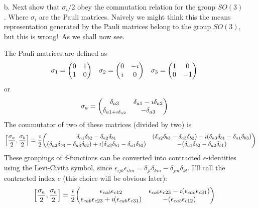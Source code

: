 \documentclass[a4paper,twoside]{article}
\begin{document}
\begin{itemize}
    \item[b.] Next show that $ \sigma_i/2 $ obey the commutation relation for the group $ SO(3) $. Where $ \sigma_i $ are the Pauli matrices. Naively we might think this the means representation generated by the Pauli matrices belong to the group $ SO(3) $, but this is wrong!\ As we shall now see.
        \begin{problem}
            The Pauli matrices are defined as
            \begin{equation}
                \sigma_1 = \mqty(0&1\\1&0) \quad \sigma_2 = \mqty(0&- \imath\\ \imath &0) \quad \sigma_3 = \mqty(1&0\\0&-1)
            \end{equation}
            or
            \begin{equation}
                \sigma_a = \mqty(\delta_{a3} & \delta_{a1} - \imath \delta_{a2} \\ \delta_{a1 + \imath \delta_{a2}} & - \delta_{a3})
            \end{equation}
            The commutator of two of these matrices (divided by two) is
            \begin{equation}
                \comm{\frac{\sigma_a}{2}}{\frac{\sigma_b}{2}} = \frac{\imath}{2} \mqty(\delta_{a1} \delta_{b2} - \delta_{a2} \delta_{b1} & (\delta_{a2} \delta_{b3} - \delta_{a3} \delta_{b2}) - \imath (\delta_{a3} \delta_{b1} - \delta_{a1} \delta_{b3}) \\ (\delta_{a2} \delta_{b3} - \delta_{a3} \delta_{b2})+ \imath (\delta_{a3} \delta_{b1} - \delta_{a1} \delta_{b3}) & -(\delta_{a1} \delta_{b2} - \delta_{a2} \delta_{b1}))
            \end{equation}
            These groupings of $\delta$-functions can be converted into contracted $\epsilon$-identities using the Levi-Civita symbol, since $ \epsilon_{ijk} \epsilon_{ilm} = \delta_{jl} \delta_{km} - \delta_{jm} \delta_{kl} $. I'll call the contracted index $ c $ (this choice will be obvious later):
            \begin{equation}
                \comm{\frac{\sigma_a}{2}}{\frac{\sigma_b}{2}} = \frac{\imath}{2} \mqty(\epsilon_{cab} \epsilon_{c12} & \epsilon_{cab} \epsilon_{c23} - \imath (\epsilon_{cab} \epsilon_{c31}) \\ \epsilon_{cab} \epsilon_{c23} + \imath (\epsilon_{cab} \epsilon_{c31}) & -(\epsilon_{cab} \epsilon_{c12})) 
            \end{equation}

\end{problem}
\end{itemize}
\end{document}
